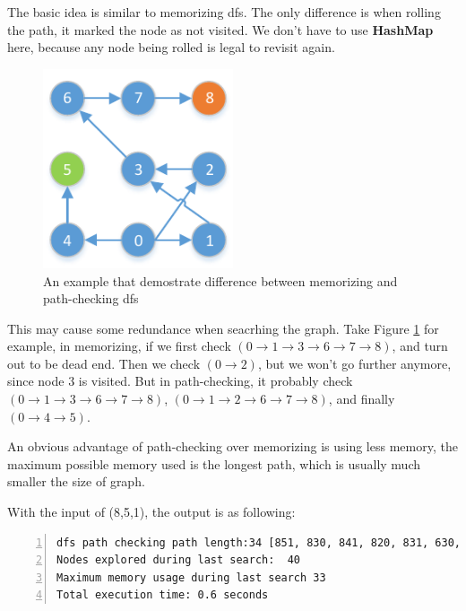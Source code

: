 \documentclass{article}
\begin{document}
The basic idea is similar to memorizing dfs. The only difference is when rolling the path, it marked the node as not visited. We don't have to use \textbf{HashMap} here, because any node being rolled is legal to revisit again.

\begin{figure}[!h]
\centering
\includegraphics[width=0.5\textwidth]{hw1-fig-2.pdf}
\caption{An example that demostrate difference between memorizing and path-checking dfs}
\label{diff}
\end{figure}

This may cause some redundance when seacrhing the graph. Take Figure \ref{diff} for example, in memorizing, if we first check $(0 \rightarrow 1 \rightarrow 3 \rightarrow 6 \rightarrow 7 \rightarrow 8)$, and turn out to be dead end. Then we check $(0 \rightarrow 2)$, but we won't go further anymore, since node $3$ is visited. But in path-checking, it probably check $(0 \rightarrow 1 \rightarrow 3 \rightarrow 6 \rightarrow 7 \rightarrow 8)$, $(0 \rightarrow 1 \rightarrow 2 \rightarrow 6 \rightarrow 7 \rightarrow 8)$, and finally $(0 \rightarrow 4 \rightarrow 5)$.

An obvious advantage of path-checking over memorizing is using less memory, the maximum possible memory used is the longest path, which is usually much smaller the size of graph.

With the input of (8,5,1), the output is as following:

\begin{lstlisting}[numbers=left]
dfs path checking path length:34 [851, 830, 841, 820, 831, 630, 641, 540, 551, 530, 541, 520, 531, 430, 441, 420, 431, 410, 421, 320, 331, 310, 321, 300, 311, 210, 221, 200, 211, 100, 111, 10, 21, 0]
Nodes explored during last search:  40
Maximum memory usage during last search 33
Total execution time: 0.6 seconds
\end{lstlisting}
\end{document}
